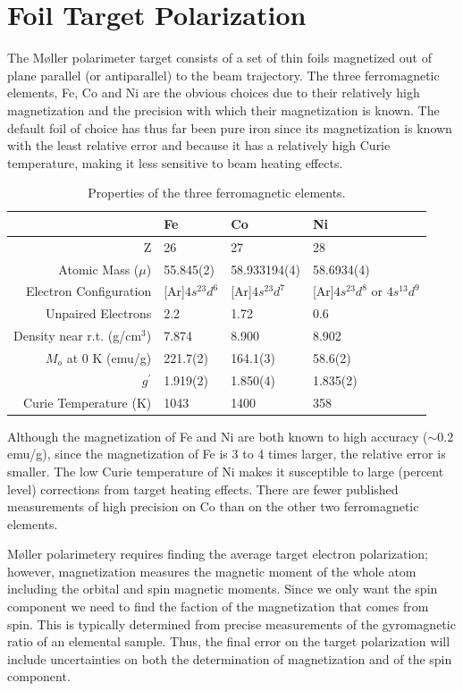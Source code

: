 \documentclass[12pt]{article}
\begin{document}
\section{Foil Target Polarization}
The M\o ller polarimeter target consists of a set of thin foils magnetized out of plane parallel (or antiparallel) to the beam trajectory. The three ferromagnetic elements, Fe, Co and Ni are the obvious choices due to their relatively high magnetization and the precision with which their magnetization is known. The default foil of choice has thus far been pure iron since its magnetization is known with the least relative error and because it has a relatively high Curie temperature, making it less sensitive to beam heating effects.
\begin{table}[h]
\begin{center}
\begin{tabular}{|r|l|l|l|}\hline
~&Fe&Co&Ni\\\hline
Z&26&27&28\\
Atomic Mass ($\mu$)&55.845(2)&58.933194(4)&58.6934(4)\\
Electron Configuration&[Ar]$4s^23d^6$&[Ar]$4s^23d^7$&[Ar]$4s^23d^8$ or $4s^13d^9$\\
Unpaired Electrons&2.2&1.72&0.6\\
Density near r.t. (g/cm$^3$)&7.874&8.900&8.902\\
$M_o$ at 0 K (emu/g)&221.7(2)&164.1(3)&58.6(2)\\
$g^{\prime}$&1.919(2)&1.850(4)&1.835(2)\\
Curie Temperature (K)& 1043&1400&358\\\hline
\end{tabular}
\end{center}
\caption{Properties of the three ferromagnetic elements.}
\end{table}

Although the magnetization of Fe and Ni are both known to high accuracy ($\sim0.2$ emu/g), since the magnetization of Fe is 3 to 4 times larger, the relative error is smaller. The low Curie temperature of Ni makes it susceptible to large (percent level) corrections from target heating effects. There are fewer published measurements of high precision on Co than on the other two ferromagnetic elements.

M\o ller polarimetery requires finding the average target electron polarization; however, magnetization measures the magnetic moment of the whole atom including the orbital and spin magnetic moments. Since we only want the spin component we need to find the faction of the magnetization that comes from spin. This is typically determined from precise measurements of the gyromagnetic ratio of an elemental sample. Thus, the final error on the target polarization will include uncertainties on both the determination of magnetization and of the spin component.
\end{document}
